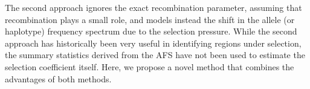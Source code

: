 The second approach ignores the exact recombination parameter, assuming
that recombination plays a small role, and models instead the shift in
the allele (or haplotype) frequency spectrum due to the selection
pressure. While the second approach has historically been very useful
in identifying regions under selection, the summary statistics derived
from the AFS have not been used to estimate the selection coefficient
itself. Here, we propose a novel method that combines the advantages
of both methods.





